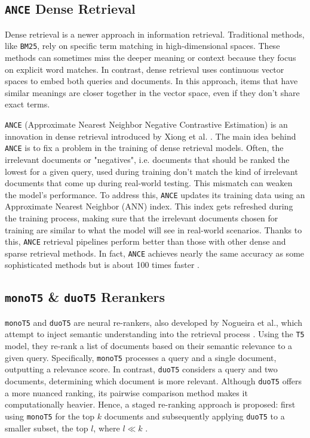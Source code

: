 \documentclass[sigconf]{acmart}
\begin{document}
\subsection{\texttt{ANCE} Dense Retrieval}\label{sec:ance}
Dense retrieval is a newer approach in information retrieval. Traditional methods, like \texttt{BM25}, rely on specific term matching in high-dimensional spaces. These methods can sometimes miss the deeper meaning or context because they focus on explicit word matches. In contrast, dense retrieval uses continuous vector spaces to embed both queries and documents. In this approach, items that have similar meanings are closer together in the vector space, even if they don't share exact terms.

\texttt{ANCE} (Approximate Nearest Neighbor Negative Contrastive Estimation) is an innovation in dense retrieval introduced by Xiong et al. \cite{xiong2020ance}. The main idea behind \texttt{ANCE} is to fix a problem in the training of dense retrieval models. Often, the irrelevant documents or "negatives", i.e. documents that should be ranked the lowest for a given query, used during training don't match the kind of irrelevant documents that come up during real-world testing. This mismatch can weaken the model's performance. To address this, \texttt{ANCE} updates its training data using an Approximate Nearest Neighbor (ANN) index. This index gets refreshed during the training process, making sure that the irrelevant documents chosen for training are similar to what the model will see in real-world scenarios. Thanks to this, \texttt{ANCE} retrieval pipelines perform better than those with other dense and sparse retrieval methods. In fact, \texttt{ANCE} achieves nearly the same accuracy as some sophisticated methods but is about 100 times faster \cite{xiong2020ance}.

\subsection{\texttt{monoT5} \& \texttt{duoT5} Rerankers}\label{sec:re-rankers}
\texttt{monoT5} and \texttt{duoT5} are neural re-rankers, also developed by Nogueira et al., which attempt to inject semantic understanding into the retrieval process \cite{nogueira2020document,nogueira2019multi}. Using the \texttt{T5} model, they re-rank a list of documents based on their semantic relevance to a given query. Specifically, \texttt{monoT5} processes a query and a single document, outputting a relevance score. In contrast, \texttt{duoT5} considers a query and two documents, determining which document is more relevant. Although \texttt{duoT5} offers a more nuanced ranking, its pairwise comparison method makes it computationally heavier. Hence, a staged re-ranking approach is proposed: first using \texttt{monoT5} for the top $k$ documents and subsequently applying \texttt{duoT5} to a smaller subset, the top $l$, where $l \ll k$ \cite{nogueira2019multi,pradeep2021expando}.
\end{document}
